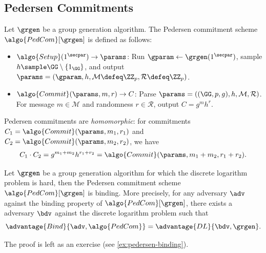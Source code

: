 \subsection{Pedersen Commitments}

\begin{definition}
  Let $\grgen$ be a group generation algorithm.
  The Pedersen commitment scheme $\algo{PedCom}[\grgen]$ is defined as follows:
  \begin{itemize}
  \item $\algo{Setup}(1^\secpar) \rightarrow \params$: Run $\gparam \gets \grgen(1^\secpar)$, sample $h \sample \GG \setminus \{1_\GG\}$, and output $\params = (\gparam, h, \mathcal{M} \defeq \ZZ_p, \mathcal{R} \defeq \ZZ_p)$.
  \item $\algo{Commit}(\params, m, r) \rightarrow C$: Parse $\params = ((\GG, p, g), h, \mathcal{M}, \mathcal{R})$. For message $m \in \mathcal{M}$ and randomness $r \in \mathcal{R}$, output $C = g^m h^r$.
  \end{itemize}
\end{definition}

\begin{remark}
  Pedersen commitments are \emph{homomorphic}: for commitments $C_1 = \algo{Commit}(\params, m_1, r_1)$ and $C_2 = \algo{Commit}(\params, m_2, r_2)$, we have
  \[
  C_1 \cdot C_2 = g^{m_1 + m_2} h^{r_1 + r_2} = \algo{Commit}(\params, m_1 + m_2, r_1 + r_2).
  \]
\end{remark}

\begin{theorem}\label{thm:pedersen-binding}
  Let $\grgen$ be a group generation algorithm for which the discrete logarithm problem is hard, then the Pedersen commitment scheme $\algo{PedCom}[\grgen]$ is binding.
  More precisely, for any \ppt adversary $\adv$ against the binding property of $\algo{PedCom}[\grgen]$, there exists a \ppt adversary $\bdv$ against the discrete logarithm problem such that
  \[
  \advantage{Bind}{\adv, \algo{PedCom}} = \advantage{DL}{\bdv, \grgen}.
  \]
\end{theorem}

The proof is left as an exercise (see \autoref{ex:pedersen-binding}).

